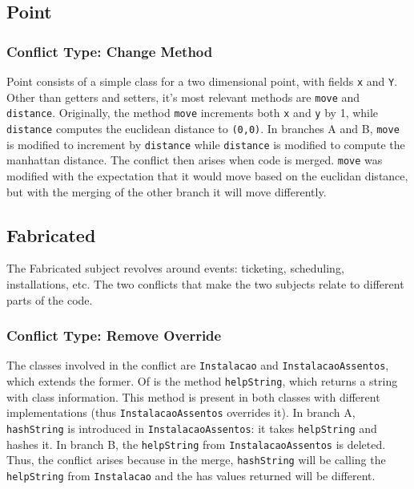 
\subsection{Point}

\subsubsection{Conflict Type: Change Method}

Point consists of a simple class for a two dimensional point, with fields \texttt{x} and \texttt{Y}.
Other than getters and setters, it's most relevant methods are \texttt{move} and \texttt{distance}.
Originally, the method \texttt{move} increments both \texttt{x} and \texttt{y} by 1, while \texttt{distance} computes the euclidean distance to \texttt{(0,0)}.
In branches A and B, \texttt{move} is modified to increment by \texttt{distance} while \texttt{distance} is modified to compute
the manhattan distance.  The conflict then arises when code is merged.  \texttt{move} was modified with the expectation that it would move
based on the euclidan distance, but with the merging of the other branch it will move differently.

\subsection{Fabricated}

The Fabricated subject revolves around events: ticketing, scheduling, installations, etc. The two
conflicts that make the two subjects relate to different parts of the code.

\subsubsection{Conflict Type: Remove Override}

The classes involved in the conflict are \texttt{Instalacao} and \texttt{InstalacaoAssentos}, which extends the former.
Of is the method \texttt{helpString}, which returns a string with class information.  This method is present
in both classes with different implementations (thus \texttt{InstalacaoAssentos} overrides it). In branch A,
\texttt{hashString} is introduced in \texttt{InstalacaoAssentos}: it takes \texttt{helpString} and hashes it. In branch B,
the \texttt{helpString} from \texttt{InstalacaoAssentos} is deleted. Thus, the conflict arises because in the merge,
\texttt{hashString} will be calling the \texttt{helpString} from \texttt{Instalacao} and the has values returned will be different.

